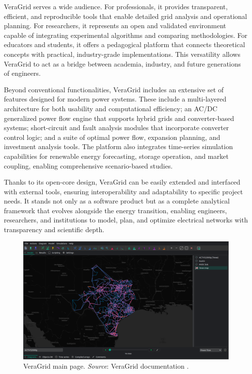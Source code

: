 VeraGrid serves a wide audience. For professionals, it provides transparent, efficient, and reproducible tools that enable detailed grid analysis and operational planning. 
For researchers, it represents an open and validated environment capable of integrating experimental algorithms and comparing methodologies. For educators and students, 
it offers a pedagogical platform that connects theoretical concepts with practical, industry-grade implementations. This versatility allows VeraGrid to act as a bridge between 
academia, industry, and future generations of engineers.

Beyond conventional functionalities, VeraGrid includes an extensive set of features designed for modern power systems. 
These include a multi-layered architecture for both usability and computational efficiency; an AC/DC generalized power flow engine that supports hybrid 
grids and converter-based systems; short-circuit and fault analysis modules that incorporate converter control logic; and a suite of optimal power flow, expansion planning, 
and investment analysis tools. The platform also integrates time-series simulation capabilities for renewable energy forecasting, storage operation, and market coupling, 
enabling comprehensive scenario-based studies. 

Thanks to its open-core design, VeraGrid can be easily extended and interfaced with external tools, ensuring interoperability and adaptability to specific project needs. 
It stands not only as a software product but as a complete analytical framework that evolves alongside the energy transition, enabling engineers, researchers, and institutions 
to model, plan, and optimize electrical networks with transparency and scientific depth.

\begin{figure}[H]
  \centering
  \includegraphics[width=0.8\linewidth]{figures/VeraGrid_main_page.png}
  \caption{VeraGrid main page. \textit{Source}: VeraGrid documentation \cite{veragrid}.}
  \label{fig:VeraGrid_main}
\end{figure}


